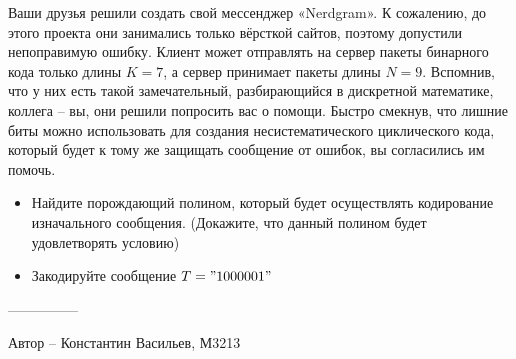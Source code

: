 \question
Ваши друзья решили создать свой мессенджер «Nerdgram». К сожалению, до этого проекта они занимались только вёрсткой сайтов, поэтому допустили непоправимую ошибку. Клиент может отправлять на сервер пакеты бинарного кода только длины $K = 7$, а сервер принимает пакеты длины $N = 9$. Вспомнив, что у них есть такой замечательный, разбирающийся в дискретной математике, коллега -- вы, они решили попросить вас о помощи. Быстро смекнув, что лишние биты можно использовать для создания несистематического циклического кода, который будет к тому же защищать сообщение от ошибок, вы согласились им помочь.
\begin{itemize}
\item Найдите порождающий полином, который будет осуществлять кодирование изначального сообщения. (Докажите, что данный полином будет удовлетворять условию)
\item Закодируйте сообщение $T = "1000001"$
\end{itemize}

---------------

Автор -- Константин Васильев, М3213